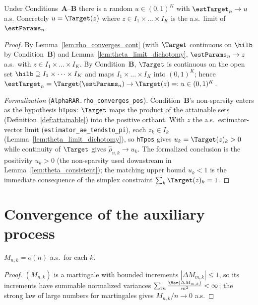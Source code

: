 \begin{lemma}\label{lem:rho_converges}
\leanok
{}
Under Conditions~\textbf{A}--\textbf{B} there is a random $u \in (0,1)^K$ with
$\estTarget_n \to u$ a.s. Concretely $u = \Target(z)$ where $z\in I_1\times\dots\times I_K$
is the a.s.\ limit of $\estParams_n$.
\end{lemma}

\begin{proof}\leanok
{}
By Lemma~\ref{lem:rho_converges_cont} (with $\Target$ continuous on $\hilb$ by Condition~\textbf{B})
and Lemma~\ref{lem:theta_limit_dichotomy}, $\estParams_n \to z$ a.s.\ with
$z \in I_1\times\dots\times I_K$. By Condition~\textbf{B}, $\Target$ is
continuous on the open set $\hilb \supseteq I_1\times\dots\times I_K$ and maps
$I_1\times\dots\times I_K$ into $(0,1)^K$; hence
$\estTarget_n = \Target(\estParams_n) \to \Target(z) =: u \in (0,1)^K$.

\emph{Formalization} (\texttt{AlphaRAR.rho\_converges\_pos}). Condition~\textbf{B}'s non-sparsity
enters as the hypothesis \texttt{hTpos}: $\Target$ maps the product of the attainable sets
(Definition~\ref{def:attainable}) into the positive orthant. With $z$ the a.s.\ estimator-vector
limit (\texttt{estimator\_ae\_tendsto\_pi}), each $z_k\in I_k$
(Lemma~\ref{lem:theta_limit_dichotomy}), so \texttt{hTpos} gives $u_k=\Target(z)_k>0$ while
continuity of $\Target$ gives $\hat\rho_{n,k}\to u_k$. The formalized conclusion is the positivity
$u_k>0$ (the non-sparsity used downstream in Lemma~\ref{lem:theta_consistent}); the matching upper
bound $u_k<1$ is the immediate consequence of the simplex constraint $\sum_k\Target(z)_k=1$.
\end{proof}

\section{Convergence of the auxiliary process}
\label{sec:cons_U}

\begin{lemma}\label{lem:M_lln}
\leanok
{}
$M_{n,k} = o(n)$ a.s.\ for each $k$.
\end{lemma}

\begin{proof}\leanok
{}
$(M_{n,k})$ is a martingale with bounded increments $|\Delta M_{m,k}|\le1$, so its
increments have summable normalized variances $\sum_m \frac{\Var(\Delta M_{m,k})}{m^2}<\infty$;
the strong law of large numbers for martingales gives $M_{n,k}/n \to 0$ a.s.
\end{proof}

